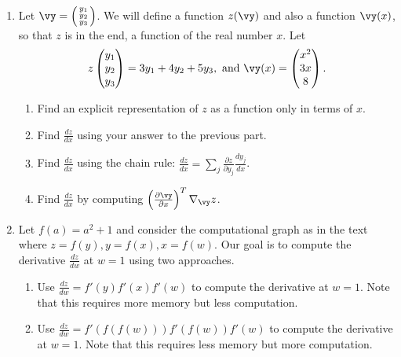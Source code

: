 \documentclass{article}
\begin{document}
\begin{enumerate}
\item \label{DFN_ex_chainrule} 
Let $\vy = \left(\begin{smallmatrix} y_1\\y_2\\y_3 \end{smallmatrix}\right)$. We will define a function $z(\vy)$ and also a function $\vy(x)$, so that $z$ is in the end, a function of the real number $x$. Let
\begin{equation*}
    z\begin{pmatrix} y_1\\y_2\\y_3 \end{pmatrix} = 3y_1 + 4y_2 + 5y_3,
    \text{ and } 
    \vy(x) = \begin{pmatrix} x^2 \\ 3x \\ 8 \end{pmatrix}.
\end{equation*}
\begin{enumerate}
    \item Find an explicit representation of $z$ as a function only in terms of $x$.
    \item Find $\frac{dz}{dx}$ using your answer to the previous part.
    \item Find $\frac{dz}{dx}$ using the chain rule: $\frac{dz}{dx} = \sum_j \frac{\partial z}{\partial y_j} \frac{dy_j}{dx}$.
    \item Find $\frac{dz}{dx}$ by computing 
    $\left(\frac{\partial \vy}{\partial x}\right)^T \nabla_\vy z$.

\end{enumerate}

\item \label{DFN_ex_chainbackprop} 
Let $f(a) = a^2 + 1$ and consider the computational graph as in the text where $z = f(y), y = f(x), x = f(w)$. Our goal is to compute the derivative $\frac{dz}{dw}$ at $w = 1$ using two approaches.
\begin{enumerate} 
    \item Use $\frac{dz}{dw} = f'(y)f'(x)f'(w)$ to compute the derivative at $w=1$. Note that this requires more memory but less computation.
    \item Use $\frac{dz}{dw} = f'(f(f(w)))f'(f(w))f'(w)$ to compute the derivative at $w=1$. Note that this requires less memory but more computation.
\end{enumerate}


\end{enumerate}
\end{document}
